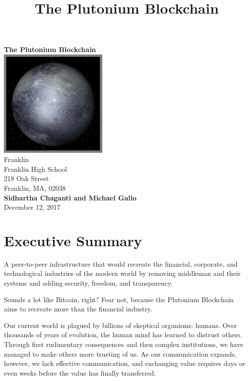 \documentclass[12pt]{article}
\title{The Plutonium Blockchain}
\begin{document}
\begin{titlepage}
	\begin{center}
		\vspace{1cm}
		\Huge
		\textbf{The Plutonium Blockchain\\}
		\vspace{1.5cm}
		\includegraphics[width=0.4\textwidth]{pluto}\\
		\vspace{1.5cm}
		\large
		Franklin\\
		Franklin High School\\
		218 Oak Street\\
		Franklin, MA, 02038\\
		\vspace{1.5cm}
		\textbf{Sidhartha Chaganti and Michael Gallo}\\
		December 12, 2017
	\end{center}
\end{titlepage}
\newpage
\tableofcontents
\newpage
{}
\section{Executive Summary}
A peer-to-peer infrastructure that would recreate the financial, corporate, and technological industries of the modern world by removing middleman and their systems and adding security, freedom, and transparency.

Sounds a lot like Bitcoin, right? Fear not, because the Plutonium Blockchain aims to recreate more than the financial industry.

Our current world is plagued by billions of skeptical organisms: humans. Over thousands of years of evolution, the human mind has learned to distrust others. Through first rudimentary consequences and then complex institutions, we have managed to make others more trusting of us. As our communication expands, however, we lack effective communication, and exchanging value requires days or even weeks before the value has finally transferred.
\end{document}
